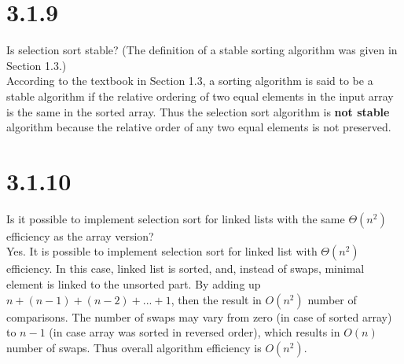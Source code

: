 \documentclass[8pt, letterpaper]{article}
\begin{document}
\section{3.1.9}
Is selection sort stable? (The definition of a stable sorting algorithm was given
in Section 1.3.) \\
\indent \indent According to the textbook in Section 1.3, a sorting algorithm is said to be a stable algorithm if the relative ordering of two equal elements in the input array is the same in the sorted array. Thus the selection sort algorithm is \textbf{not stable} algorithm because the relative order of any two equal elements is not preserved.

\section{3.1.10}
Is it possible to implement selection sort for linked lists with the same $\Theta(n^2)$
efficiency as the array version? \\
\indent \indent Yes. It is possible to implement selection sort for linked list with $\Theta(n^2)$ efficiency. In this case, linked list is sorted, and, instead of swaps, minimal element is linked to the unsorted part. By adding up $n + (n-1) + (n-2) + ... + 1$, then the result in $O(n^2)$ number of comparisons. The number of swaps may vary from zero (in case of sorted array) to $n-1$ (in case array was sorted in reversed order), which results in $O(n)$ number of swaps. Thus overall algorithm efficiency is $O(n^2)$.
\end{document}
